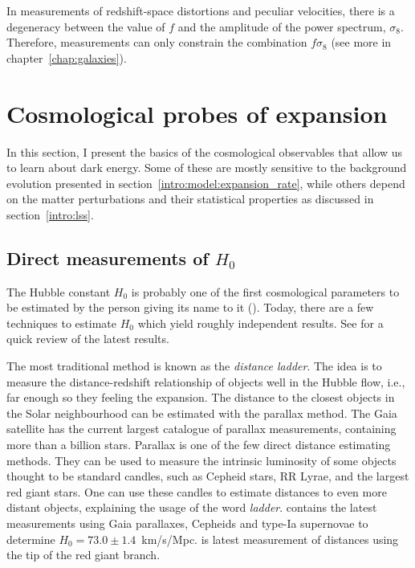     In measurements of redshift-space distortions and peculiar velocities, 
    there is a degeneracy between the value of $f$ and the
    amplitude of the power spectrum, $\sigma_8$. Therefore, 
    measurements can only constrain the combination $f\sigma_8$
    (see more in chapter~\ref{chap:galaxies}).


    

\section{Cosmological probes of expansion}
\label{intro:probes}

    In this section, I present the basics of the cosmological 
    observables that allow us to learn about dark energy. 
    Some of these are mostly sensitive to the background evolution
    presented in section~\ref{intro:model:expansion_rate}, while others 
    depend on the matter perturbations and their statistical properties as 
    discussed in section~\ref{intro:lss}. 

    \subsection{Direct measurements of \texorpdfstring{$H_0$}{the Hubble constant}}
    \label{intro:probes:h0}

    The Hubble constant $H_0$ is probably one of the first cosmological parameters 
    to be estimated by the person giving its name to it (\cite{hubbleRelationDistanceRadial1929}).
    Today, there are a few techniques to estimate $H_0$ which yield roughly independent results.
    See \cite{riessExpansionUniverseFaster2020} for a quick review of the latest results.  

    The most traditional method is known as the \emph{distance ladder}. 
    The idea is to measure the distance-redshift relationship of objects 
    well in the Hubble flow, i.e., far enough so they feeling the expansion. 
    The distance to the closest objects in the Solar neighbourhood can 
    be estimated with the parallax method. The Gaia satellite has the current largest catalogue 
    of parallax measurements, containing more than a billion stars. 
    Parallax is one of the few direct distance estimating methods. They can be used to 
    measure the intrinsic luminosity of some objects thought to be standard candles, such as 
    Cepheid stars, RR Lyrae, and the largest red giant stars. 
    One can use these candles to estimate distances to even more distant objects, 
    explaining the usage of the word \emph{ladder}. 
    \cite{riessCosmicDistancesCalibrated2021a} contains the latest measurements using 
    Gaia parallaxes, Cepheids and type-Ia supernovae 
    to determine $H_0 = 73.0 \pm 1.4$~km/s/Mpc.  
    \cite{freedmanCarnegieChicagoHubbleProgram2019}
    is latest measurement of distances using the tip of the red giant branch. 
    
